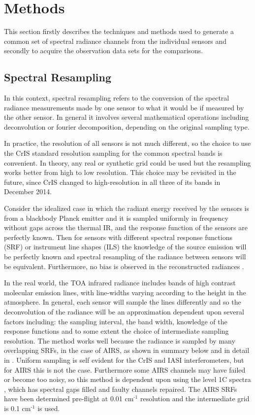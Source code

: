 \documentclass[11pt]{article}
\begin{document}
\section{Methods}
\label{sec:orgheadline6}

This section firstly describes the techniques and methods used to generate a common set of spectral radiance channels from the individual sensors and secondly to acquire the observation data sets for the comparisons. 

\subsection{Spectral Resampling}
\label{sec:orgheadline4}

In this context, spectral resampling refers to the conversion of the spectral radiance measurements made by one sensor to what it would be if measured by the other sensor. In general it involves several mathematical operations including deconvolution or fourier decomposition, depending on the original sampling type.

In practice, the resolution of all sensors is not much different, so the choice to use the CrIS standard resolution sampling for the common spectral bands is convenient. In theory, any real or synthetic grid could be used but the resampling works better from high to low resolution. This choice may be revisited in the future, since CrIS changed to high-resolution in all three of its bands in December 2014.

Consider the idealized case in which the radiant energy received by the sensors is from a blackbody Planck emitter and it is sampled uniformly in frequency without gaps across the thermal IR, and the response function of the sensors are perfectly known. Then for sensors with different spectral response functions (SRF) or instrument line shapes (ILS) the knowledge of the source emission will be perfectly known and spectral resampling of the radiance between sensors will be equivalent. Furthermore, no bias is observed in the reconstructed radiances \cite{Motteler2017b}. 

In the real world, the TOA infrared radiance includes bands of high contrast molecular emission lines, with line-widths varying according to the height in the atmosphere. In general, each sensor will sample the lines differently and so the deconvolution of the radiance will be an approximation dependent upon several factors including: the sampling interval, the band width, knowledge of the response functions and to some extent the choice of intermediate sampling resolution. The method works well because the radiance is sampled by many overlapping SRFs, in the case of AIRS, as shown in summary below and in detail in \cite{Motteler2017a}. Uniform sampling is self evident for the CrIS and IASI interferometers, but for AIRS this is not the case. Furthermore some AIRS channels may have failed or become too noisy, so this method is dependent upon using the level 1C spectra \cite{Manning2015}, which has spectral gaps filled and faulty channels repaired. The AIRS SRFs have been determined pre-flight at 0.01 cm\(^{\text{-1}}\) resolution and the intermediate grid is 0.1 cm\(^{\text{-1}}\) is used.
\end{document}
